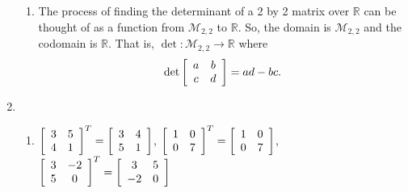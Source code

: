 \begin{enumerate}
\begin{enumerate}
\item The process of finding the determinant of a 2 by 2 matrix over $\mathbb{R}$ can be thought of as a function from $\mathcal{M}_{2, 2}$ to $\mathbb{R}$.  So, the domain is 
$\mathcal{M}_{2, 2}$ and the codomain is $\mathbb{R}$.  That is, 
$\det : \mathcal{M}_{2, 2} \to \mathbb{R}$ where
\[
\det \left[ {\begin{array}{*{20}c}
   a & b  \\
   c & d  \\
\end{array} } \right] = ad - bc.
\]
\end{enumerate}

\item \begin{enumerate}
\item $\left[ {\begin{array}{*{20}c}
   3 & 5  \\
   4 & 1  \\
\end{array} } \right]^T =  \left[ {\begin{array}{*{20}c}
   3 & 4  \\
   5 & 1  \\
\end{array} } \right]$, \qquad
$\left[ {\begin{array}{*{20}c}
   1 & 0  \\
   0 & 7  \\
\end{array} } \right]^T =  \left[ {\begin{array}{*{20}c}
   1 & 0  \\
   0 & 7  \\
\end{array} } \right]$, \\
$\left[ {\begin{array}{*{20}c}
   3 & -2  \\
   5 & 0  \\
\end{array} } \right]^T =  \left[ {\begin{array}{*{20}c}
   3 & 5  \\
   -2 & 0  \\
\end{array} } \right]$


\end{enumerate}
\end{enumerate}
